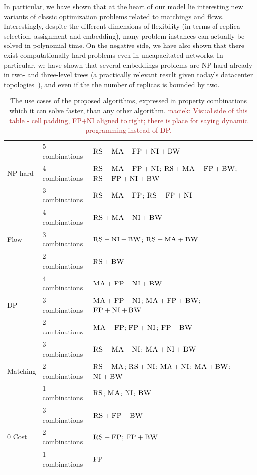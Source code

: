 \documentclass[9pt]{sigcomm-alternate}
\newcommand{\maciek}[1]{\textcolor{brown}{maciek: #1}}
\newcommand{\CC}{\textsc{NI}}
\newcommand{\FP}{\textsc{FP}}
\newcommand{\RS}{\textsc{RS}}
\newcommand{\BW}{\textsc{BW}}
\newcommand{\MA}{\textsc{MA}}
\begin{document}
In particular, we have shown that
at the heart of our model lie interesting new variants of classic
optimization problems related to matchings and flows. Interestingly, despite the
different dimensions of flexibility (in terms of replica selection, assignment and embedding),
many problem instances can actually be solved in polynomial time.
On the negative side, we have also shown that there exist computationally hard
problems even in uncapacitated networks. In particular,
we have shown that several embeddings problems are NP-hard already in two- and three-level trees
(a practically relevant result given today's datacenter topologies~\cite{fattree}),
and even if the the number of replicas is bounded by two.
\begin{table}


\begin{small}
\begin{tabular}{|l|l|p{4cm}|}
\hline
\multirow{3}{*}{NP-hard} & 5 combinations & \mbox{$\RS+\MA+\FP+\CC+\BW$}\\
\cline{2-3}
 & 4 combinations &  \mbox{$\RS+\MA+\FP+\CC$}; \mbox{$\RS+\MA+\FP+\BW$};
\mbox{$\RS+\FP+\CC+\BW$} \\ \cline{2-3}
 & 3 combinations &\mbox{$\RS+\MA+\FP$}; \mbox{$\RS+\FP+\CC$} \\
 \hline
 \hline
\multirow{3}{*}{Flow} & 4 combinations & \mbox{$\RS+\MA+\CC+\BW$} \\ \cline{2-3}
 & 3 combinations & \mbox{$\RS+\CC+\BW$}; \mbox{$\RS+\MA+\BW$}    \\ \cline{2-3}
 & 2 combinations &$\RS+\BW$ \\
 \hline
 \hline
\multirow{3}{*}{DP} & 4 combinations & \mbox{$\MA+\FP+\CC+\BW$} \\ \cline{2-3}
 & 3 combinations &   \mbox{$\MA+\FP+\CC$};
\mbox{$\MA+\FP+\BW$}; \mbox{$\FP+\CC+\BW$} \\ \cline{2-3}
 & 2 combinations &\mbox{$\MA+\FP$}; \mbox{$\FP+\CC$};
\mbox{$\FP+\BW$} \\
 \hline
 \hline
\multirow{3}{*}{Matching} &3 combinations&
\mbox{$\RS+\MA+\CC$}; \mbox{$\MA+\CC+\BW$}  \\
\cline{2-3}
 & 2 combinations & \mbox{$\RS+\MA$};
\mbox{$\RS+\CC$}; \mbox{$\MA+\CC$};
\mbox{$\MA+\BW$}; \mbox{$\CC+\BW$} \\ \cline{2-3}
& 1 combinations & \mbox{$\RS$}; \mbox{$\MA$};
\mbox{$\CC$}; \mbox{$\BW$}\\
 \hline
 \hline
 \multirow{3}{*}{0 Cost} & 3 combinations & \mbox{$\RS+\FP+\BW$}\\
\cline{2-3}
 & 2 combinations & \mbox{$\RS+\FP$}; \mbox{$\FP+\BW$}
\\ \cline{2-3}
 & 1 combinations & \mbox{$\FP$}\\
 \hline
\end{tabular}
\end{small}
\caption{
The use cases of the proposed algorithms, expressed in property
combinations which it can solve faster, than any other algorithm.
\maciek{Visual side of this table - cell padding, FP+NI aligned to right; there is place for saying dynamic programming instead of DP.}
}
\label{tab:summary}
\end{table}
\end{document}
